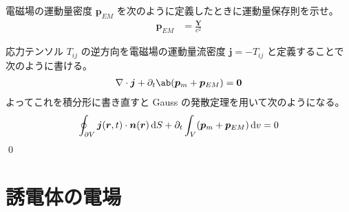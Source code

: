 \documentclass[uplatex,dvipdfmx,a4paper,11pt]{jlreq}
\makeatletter
\newcommand{\rr}{\bm{r}}
\newcommand{\pp}{\bm{p}}
\newcommand{\vnabla}{\mathbf{\nabla}}
\numberwithin{equation}{section}
\theoremstyle{definition}
\renewenvironment{proof}[1][\proofname]{\par
  \normalfont
  \topsep6\p@\@plus6\p@ \trivlist
  \item[\hskip\labelsep{\bfseries #1}\@addpunct{\bfseries}]\ignorespaces\quad\par
}{%
  \qed\endtrivlist\@endpefalse
}
\renewcommand\proofname{証明}
\makeatother
\begin{document}
\begin{problem}
電磁場の運動量密度 $\pp_{EM}$ を次のように定義したときに運動量保存則を示せ。
\begin{align}
  \pp_{EM} & = \frac{\bm{Y}}{c^2}
\end{align}
\end{problem}
\begin{proof}
  応力テンソル $T_{ij}$ の逆方向を電磁場の運動量流密度 $\bm{j} = -T_{ij}$ と定義することで次のように書ける。
  \begin{align}
    \vnabla\cdot\bm{j} + \partial_t\ab(\pp_m + \pp_{EM}) = \bm{0}
  \end{align}
  よってこれを積分形に書き直すと Gauss の発散定理を用いて次のようになる。
  \begin{align}
    \oint_{\partial V}\bm{j}(\rr, t)\cdot\bm{n}(\rr)\dl{S} + \partial_t\int_V(\pp_m + \pp_{EM})\dl{v} = 0
  \end{align}
\end{proof}



\section{誘電体の電場}

\setcounter{subsection}{5}
\end{document}
